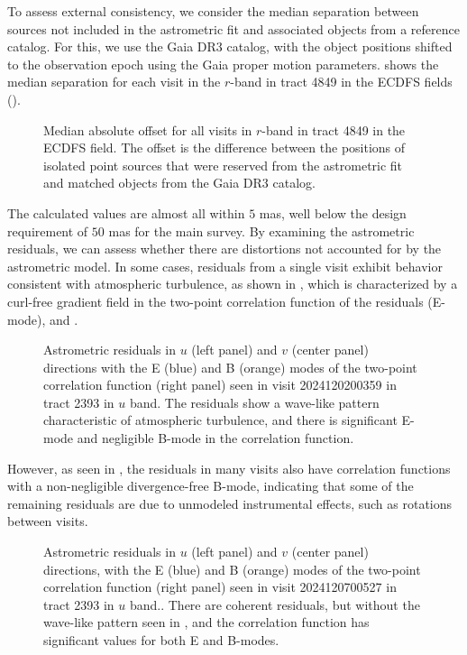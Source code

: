 To assess external consistency, we consider the median separation between sources not included in the astrometric fit and associated objects from a reference catalog.
For this, we use the Gaia \gls{DR3} catalog, with the object positions shifted to the observation epoch using the Gaia proper motion parameters.
 shows the median separation for each visit in the $r$-band in \gls{tract} 4849 in the ECDFS fields ().
\begin{figure}[htb!]
\caption{Median absolute offset for all visits in $r$-band in \gls{tract} 4849 in the ECDFS field. 
The offset is the difference between the positions of isolated point sources that were reserved from the astrometric fit and matched objects from the Gaia DR3 catalog.}
\label{fig:AA1}
\end{figure}
The calculated values are almost all within $5$\xspace mas, well below the design requirement of $50$\xspace mas for the main survey.
By examining the astrometric residuals, we can assess whether there are distortions not accounted for by the astrometric model. 
In some cases, residuals from a single visit exhibit behavior consistent with atmospheric turbulence, as shown in , which is characterized by a curl-free gradient field in the two-point correlation function of the residuals (E-mode),  \citet{Leget2021} and \citet{Fortino2021}. 
\begin{figure}[htb!]
\caption{Astrometric residuals in $u$ (left panel) and $v$ (center panel) directions with the E (blue) and B (orange) modes of the two-point correlation function (right panel) seen in visit 2024120200359 in tract 2393 in $u$ band.
The residuals show a wave-like pattern characteristic of atmospheric turbulence, and there is significant E-mode and negligible B-mode in the correlation function.}
\label{fig:Astrometry_Emode}
\end{figure}
However, as seen in , the residuals in many visits also have correlation functions with a non-negligible divergence-free B-mode, indicating that some of the remaining residuals are due to unmodeled instrumental effects, such as rotations between visits.
\begin{figure}[htb!]
\caption{Astrometric residuals in $u$ (left panel) and $v$ (center panel) directions, with the E (blue)  and B (orange) modes of the two-point correlation function (right panel) seen in visit 2024120700527 in tract 2393 in $u$ band.. 
There are coherent residuals, but without the wave-like pattern seen in , and the correlation function has significant values for both E and B-modes.}
\label{fig:Astrometry_EBmode}
\end{figure}

